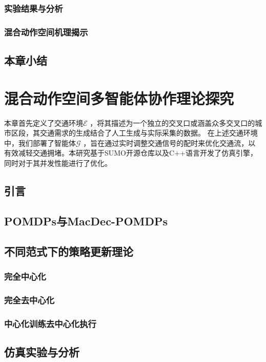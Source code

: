 \subsection{实验结果与分析}
\subsection{混合动作空间机理揭示}

\section{本章小结}



\chapter{混合动作空间多智能体协作理论探究}
本章首先定义了交通环境$\mathcal{E}$ ，将其描述为一个独立的交叉口或涵盖众多交叉口的城市区段，其交通需求的生成结合了人工生成与实际采集的数据。
在上述交通环境中，我们部署了智能体$\mathcal{G}$ ，旨在通过实时调整交通信号的配时来优化交通流，以有效减轻交通拥堵。本研究基于SUMO开源仓库以及C++语言开发了仿真引擎，同时对于其并发性能进行了优化。
\section{引言}
\section{POMDPs与MacDec-POMDPs}
\section{不同范式下的策略更新理论}

\subsection{完全中心化}
\subsection{完全去中心化}
\subsection{中心化训练去中心化执行}

\section{仿真实验与分析}

